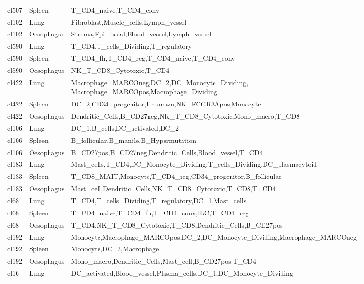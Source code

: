 \begin{table}[pht!]
\begin{tabular}{lll}
  cl507 & Spleen & T\_CD4\_naive,T\_CD4\_conv \\ 
  cl102 & Lung & Fibroblast,Muscle\_cells,Lymph\_vessel \\ 
  cl102 & Oesophagus & Stroma,Epi\_basal,Blood\_vessel,Lymph\_vessel \\ 
  cl590 & Lung & T\_CD4,T\_cells\_Dividing,T\_regulatory \\ 
  cl590 & Spleen & T\_CD4\_fh,T\_CD4\_reg,T\_CD4\_naive,T\_CD4\_conv \\ 
  cl590 & Oesophagus & NK\_T\_CD8\_Cytotoxic,T\_CD4 \\ 
  cl422 & Lung & \specialcell[t]{Macrophage\_MARCOneg,DC\_2,DC\_Monocyte\_Dividing,\\Macrophage\_MARCOpos,Macrophage\_Dividing} \\ 
  cl422 & Spleen & DC\_2,CD34\_progenitor,Unknown,NK\_FCGR3Apos,Monocyte \\ 
  cl422 & Oesophagus & Dendritic\_Cells,B\_CD27neg,NK\_T\_CD8\_Cytotoxic,Mono\_macro,T\_CD8 \\ 
  cl106 & Lung & DC\_1,B\_cells,DC\_activated,DC\_2 \\ 
  cl106 & Spleen & B\_follicular,B\_mantle,B\_Hypermutation \\ 
  cl106 & Oesophagus & B\_CD27pos,B\_CD27neg,Dendritic\_Cells,Blood\_vessel,T\_CD4 \\
  cl183 & Lung & Mast\_cells,T\_CD4,DC\_Monocyte\_Dividing,T\_cells\_Dividing,DC\_plasmacytoid \\ 
  cl183 & Spleen & T\_CD8\_MAIT,Monocyte,T\_CD4\_reg,CD34\_progenitor,B\_follicular \\ 
  cl183 & Oesophagus & Mast\_cell,Dendritic\_Cells,NK\_T\_CD8\_Cytotoxic,T\_CD8,T\_CD4 \\ 
  cl68 & Lung & T\_CD4,T\_cells\_Dividing,T\_regulatory,DC\_1,Mast\_cells \\ 
  cl68 & Spleen & T\_CD4\_naive,T\_CD4\_fh,T\_CD4\_conv,ILC,T\_CD4\_reg \\ 
  cl68 & Oesophagus & T\_CD4,NK\_T\_CD8\_Cytotoxic,T\_CD8,Dendritic\_Cells,B\_CD27pos \\ 
  cl192 & Lung & Monocyte,Macrophage\_MARCOpos,DC\_2,DC\_Monocyte\_Dividing,Macrophage\_MARCOneg \\ 
  cl192 & Spleen & Monocyte,DC\_2,Macrophage \\ 
  cl192 & Oesophagus & Mono\_macro,Dendritic\_Cells,Mast\_cell,B\_CD27pos,T\_CD4 \\ 
  cl16 & Lung & DC\_activated,Blood\_vessel,Plasma\_cells,DC\_1,DC\_Monocyte\_Dividing \\ 

\end{tabular}
\end{table}
